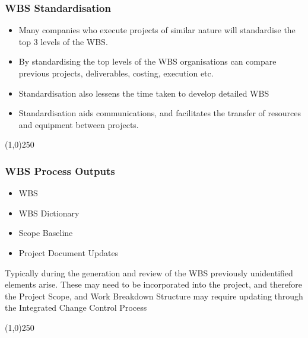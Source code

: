 \begin{frame}
\frametitle{WBS Standardisation}
\begin{itemize}
	\item Many companies who execute projects of similar nature will standardise the top 3 levels of the WBS.
	\item By standardising the top levels of the WBS organisations can compare previous projects, deliverables, costing, execution etc.
	\item Standardisation also lessens the time taken to develop detailed WBS
	\item Standardisation aids communications, and facilitates the transfer of resources and equipment between projects.
\end{itemize}
\end{frame}\begin{center}\line(1,0){250}\end{center}



\begin{frame}
\frametitle{WBS Process Outputs}
\begin{itemize}
	\item WBS
	\item WBS Dictionary
	\item Scope Baseline
	\item Project Document Updates
\end{itemize}
Typically during the generation and review of the WBS previously unidentified elements arise.  These may need to be incorporated into the project, and therefore the Project Scope, and Work Breakdown Structure may require updating through the Integrated Change Control Process
\end{frame}\begin{center}\line(1,0){250}\end{center}



 